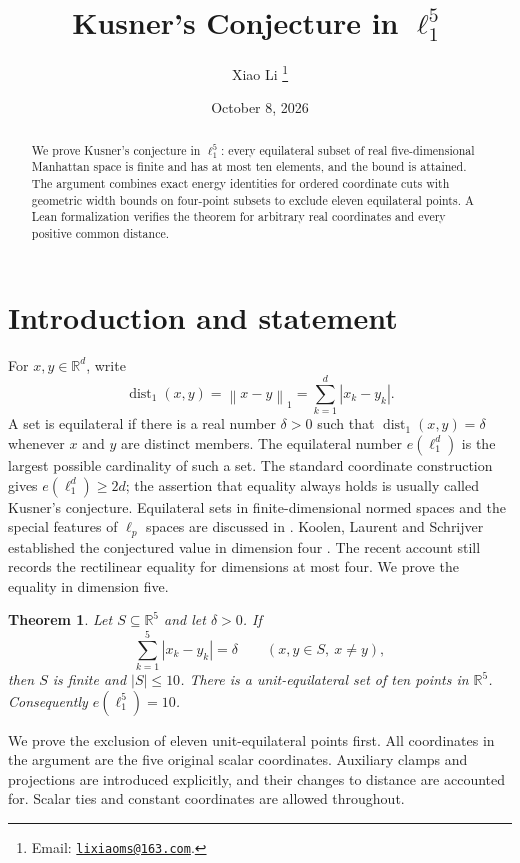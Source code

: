 \documentclass[11pt]{article}
\title{Kusner's Conjecture in \(\ell_1^5\)}
\author{Xiao Li
\thanks{Email: \href{mailto:lixiaoms@163.com}{\texttt{lixiaoms@163.com}}.}}
\date{October 8, 2026}
\newtheorem{theorem}{Theorem}[section]
\theoremstyle{definition}
\theoremstyle{remark}
\newcommand{\R}{\mathbb R}
\newcommand{\dist}{\operatorname{dist}_1}
\newcommand{\norm}[1]{\left\lVert#1\right\rVert_1}
\newcommand{\abs}[1]{\left|#1\right|}
\begin{document}
\maketitle

\begin{abstract}
We prove Kusner's conjecture in $\ell_1^5$: every equilateral subset of real
five-dimensional Manhattan space is finite and has at most ten elements,
and the bound is attained. The argument combines exact energy identities
for ordered coordinate cuts with geometric width bounds on four-point
subsets to exclude eleven equilateral points. A Lean formalization verifies
the theorem for arbitrary real coordinates and every positive common
distance.
\end{abstract}

\section{Introduction and statement}

For $x,y\in\R^d$, write
\[
 \dist(x,y)=\norm{x-y}=\sum_{k=1}^d\abs{x_k-y_k}.
\]
A set is equilateral if there is a real number $\delta>0$ such that
$\dist(x,y)=\delta$ whenever $x$ and $y$ are distinct members. The
equilateral number $e(\ell_1^d)$ is the largest possible cardinality of such
a set. The standard coordinate construction gives $e(\ell_1^d)\geq2d$;
the assertion that equality always holds is usually called Kusner's
conjecture. Equilateral sets in finite-dimensional normed spaces and the
special features of $\ell_p$ spaces are discussed in
\cite{KLS2000,AlonPudlak2003}. Koolen, Laurent and Schrijver established
the conjectured value in dimension four \cite{KLS2000}. The recent
account \cite{GeXuZhou2026} still records the rectilinear equality for
dimensions at most four. We prove the equality in dimension five.

\begin{theorem}\label{thm:main}
Let $S\subseteq\R^5$ and let $\delta>0$. If
\[
 \sum_{k=1}^5\abs{x_k-y_k}=\delta
 \qquad(x,y\in S,\ x\ne y),
\]
then $S$ is finite and $\abs{S}\leq10$. There is a unit-equilateral set
of ten points in $\R^5$. Consequently $e(\ell_1^5)=10$.
\end{theorem}

We prove the exclusion of eleven unit-equilateral points first. All
coordinates in the argument are the five original scalar coordinates.
Auxiliary clamps and projections are introduced explicitly, and their
changes to distance are accounted for. Scalar ties and constant coordinates
are allowed throughout.
\end{document}
